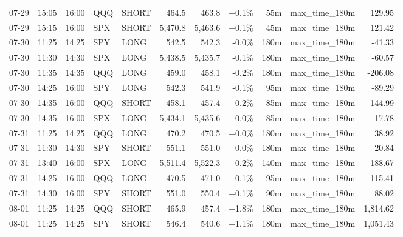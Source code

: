 \documentclass[11pt,a4paper,twoside]{article}
\begin{document}
\begin{center}
\begin{longtable}{>{\color{txtmain}}l l l l l r r r r >{\color{txtmain}}l r}
07-29 & 15:05 & 16:00 & QQQ & SHORT & 464.5 & 463.8 & \textcolor{wingreen}{+0.1\%} & 55m & max\_time\_180m & \textcolor{wingreen}{129.95} \\
07-29 & 15:15 & 16:00 & SPX & SHORT & 5,470.8 & 5,463.6 & \textcolor{wingreen}{+0.1\%} & 45m & max\_time\_180m & \textcolor{wingreen}{121.42} \\
07-30 & 11:25 & 14:25 & SPY & LONG & 542.5 & 542.3 & \textcolor{lossred}{-0.0\%} & 180m & max\_time\_180m & \textcolor{lossred}{-41.33} \\
07-30 & 11:30 & 14:30 & SPX & LONG & 5,438.5 & 5,435.7 & \textcolor{lossred}{-0.1\%} & 180m & max\_time\_180m & \textcolor{lossred}{-60.57} \\
07-30 & 11:35 & 14:35 & QQQ & LONG & 459.0 & 458.1 & \textcolor{lossred}{-0.2\%} & 180m & max\_time\_180m & \textcolor{lossred}{-206.08} \\
07-30 & 14:25 & 16:00 & SPY & LONG & 542.3 & 541.9 & \textcolor{lossred}{-0.1\%} & 95m & max\_time\_180m & \textcolor{lossred}{-89.29} \\
07-30 & 14:35 & 16:00 & QQQ & SHORT & 458.1 & 457.4 & \textcolor{wingreen}{+0.2\%} & 85m & max\_time\_180m & \textcolor{wingreen}{144.99} \\
07-30 & 14:35 & 16:00 & SPX & LONG & 5,434.1 & 5,435.6 & \textcolor{wingreen}{+0.0\%} & 85m & max\_time\_180m & \textcolor{wingreen}{17.78} \\
07-31 & 11:25 & 14:25 & QQQ & LONG & 470.2 & 470.5 & \textcolor{wingreen}{+0.0\%} & 180m & max\_time\_180m & \textcolor{wingreen}{38.92} \\
07-31 & 11:30 & 14:30 & SPY & SHORT & 551.1 & 551.0 & \textcolor{wingreen}{+0.0\%} & 180m & max\_time\_180m & \textcolor{wingreen}{20.84} \\
07-31 & 13:40 & 16:00 & SPX & LONG & 5,511.4 & 5,522.3 & \textcolor{wingreen}{+0.2\%} & 140m & max\_time\_180m & \textcolor{wingreen}{188.67} \\
07-31 & 14:25 & 16:00 & QQQ & LONG & 470.5 & 471.0 & \textcolor{wingreen}{+0.1\%} & 95m & max\_time\_180m & \textcolor{wingreen}{115.41} \\
07-31 & 14:30 & 16:00 & SPY & SHORT & 551.0 & 550.4 & \textcolor{wingreen}{+0.1\%} & 90m & max\_time\_180m & \textcolor{wingreen}{88.02} \\
08-01 & 11:25 & 14:25 & QQQ & SHORT & 465.9 & 457.4 & \textcolor{wingreen}{+1.8\%} & 180m & max\_time\_180m & \textcolor{wingreen}{1,814.62} \\
08-01 & 11:25 & 14:25 & SPY & SHORT & 546.4 & 540.6 & \textcolor{wingreen}{+1.1\%} & 180m & max\_time\_180m & \textcolor{wingreen}{1,051.43} \\

\end{longtable}
\end{center}
\end{document}
